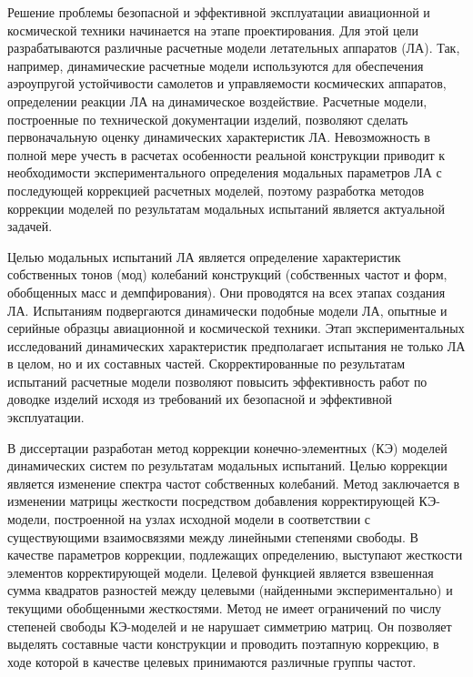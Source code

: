 
{\actuality} 

Решение проблемы безопасной и эффективной эксплуатации авиационной и космической техники начинается на этапе проектирования. Для этой цели разрабатываются различные расчетные модели летательных аппаратов (ЛА). Так, например, динамические расчетные модели используются для обеспечения аэроупругой устойчивости самолетов и управляемости космических аппаратов, определении реакции ЛА на динамическое воздействие. Расчетные модели, построенные по технической документации изделий, позволяют сделать первоначальную оценку динамических характеристик ЛА. Невозможность в полной мере учесть в расчетах особенности реальной конструкции приводит к необходимости экспериментального определения модальных параметров ЛА с последующей коррекцией расчетных моделей, поэтому разработка методов коррекции моделей по результатам модальных испытаний является актуальной задачей.

Целью модальных испытаний ЛА является определение характеристик собственных тонов (мод) колебаний конструкций (собственных частот и форм, обобщенных масс и демпфирования). Они проводятся на всех этапах создания ЛА. Испытаниям подвергаются динамически подобные модели ЛА, опытные и серийные образцы авиационной и космической техники. Этап экспериментальных исследований динамических характеристик предполагает испытания не только ЛА в целом, но и их составных частей. Скорректированные по результатам испытаний расчетные модели позволяют повысить эффективность работ по доводке изделий исходя из требований их безопасной и эффективной эксплуатации. 

В диссертации разработан метод коррекции конечно-элементных (КЭ) моделей динамических систем по результатам модальных испытаний. Целью коррекции является изменение спектра частот собственных колебаний. Метод заключается в изменении матрицы жесткости  посредством добавления корректирующей КЭ-модели, построенной на узлах исходной модели в соответствии с существующими взаимосвязями между линейными степенями свободы. В качестве параметров коррекции, подлежащих определению, выступают жесткости элементов корректирующей модели. Целевой функцией является взвешенная сумма квадратов разностей между целевыми (найденными экспериментально) и текущими обобщенными жесткостями. Метод не имеет ограничений по числу степеней свободы КЭ-моделей и не нарушает симметрию матриц. Он позволяет выделять составные части конструкции и проводить поэтапную коррекцию, в ходе которой в качестве целевых принимаются различные группы частот.

